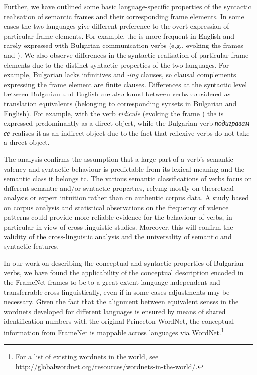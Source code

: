 \documentclass[output=paper,colorlinks,citecolor=brown]{langscibook}
\begin{document}
Further, we have outlined some basic language-specific properties of the syntactic realisation of semantic frames and their corresponding frame elements. 
In some cases the two languages give different preference to the overt expression of particular frame elements. For example, the  is more frequent in English and rarely expressed with Bulgarian communication verbs (e.g., evoking the frames  and ). %
We also observe differences in the syntactic realisation of particular frame elements due to the distinct syntactic properties of the two languages. For example, Bulgarian lacks infinitives and \textit{-ing} clauses, so clausal complements expressing the frame element  are finite clauses. Differences at the syntactic level between Bulgarian and English are also found between verbs considered as translation equivalents (belonging to corresponding synsets in Bulgarian and English). For example, with the verb \textit{ridicule} (evoking the frame ) the  is expressed predominantly as a direct object, while the Bulgarian verb \textit{подигравам се} realises it as an indirect object due to the fact that reflexive verbs do not take a direct object.

The analysis confirms the assumption that a large part of a verb’s semantic valency and syntactic behaviour is predictable from its lexical meaning and the semantic class it belongs to. The various semantic classifications of verbs focus on different semantic and/or syntactic properties, relying mostly on theoretical analysis or expert intuition rather than on authentic corpus data. A study based on corpus analysis and statistical observations on the frequency of valence patterns could provide more reliable evidence for the behaviour of verbs, in particular in view of cross-linguistic studies. Moreover, this will confirm the validity of the cross-linguistic analysis and the universality of semantic and syntactic features.


In our work on describing the conceptual and syntactic properties of Bulgarian verbs, we have found the applicability of the conceptual description encoded in the FrameNet frames to be to a great extent language-independent and transferrable cross-linguistically, even if in some cases adjustments may be necessary. Given the fact that the alignment between equivalent senses in the wordnets developed for different languages is ensured by means of shared identification numbers with the original Princeton WordNet, the conceptual information from FrameNet is mappable across languages via WordNet.\footnote{For a list of existing wordnets in the world, see \url{http://globalwordnet.org/resources/wordnets-in-the-world/}.}
\end{document}
